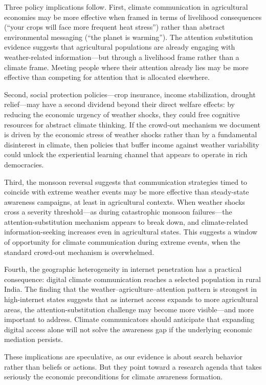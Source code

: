 \documentclass[12pt]{article}
\begin{document}
Three policy implications follow. First, climate communication in agricultural economies may be more effective when framed in terms of livelihood consequences (``your crops will face more frequent heat stress'') rather than abstract environmental messaging (``the planet is warming''). The attention substitution evidence suggests that agricultural populations are already engaging with weather-related information---but through a livelihood frame rather than a climate frame. Meeting people where their attention already lies may be more effective than competing for attention that is allocated elsewhere.

Second, social protection policies---crop insurance, income stabilization, drought relief---may have a second dividend beyond their direct welfare effects: by reducing the economic urgency of weather shocks, they could free cognitive resources for abstract climate thinking. If the crowd-out mechanism we document is driven by the economic stress of weather shocks rather than by a fundamental disinterest in climate, then policies that buffer income against weather variability could unlock the experiential learning channel that appears to operate in rich democracies.

Third, the monsoon reversal suggests that communication strategies timed to coincide with extreme weather events may be more effective than steady-state awareness campaigns, at least in agricultural contexts. When weather shocks cross a severity threshold---as during catastrophic monsoon failures---the attention-substitution mechanism appears to break down, and climate-related information-seeking increases even in agricultural states. This suggests a window of opportunity for climate communication during extreme events, when the standard crowd-out mechanism is overwhelmed.

Fourth, the geographic heterogeneity in internet penetration has a practical consequence: digital climate communication reaches a selected population in rural India. The finding that the weather--agriculture--attention pattern is strongest in high-internet states suggests that as internet access expands to more agricultural areas, the attention-substitution challenge may become more visible---and more important to address. Climate communicators should anticipate that expanding digital access alone will not solve the awareness gap if the underlying economic mediation persists.

These implications are speculative, as our evidence is about search behavior rather than beliefs or actions. But they point toward a research agenda that takes seriously the economic preconditions for climate awareness formation.
\end{document}
